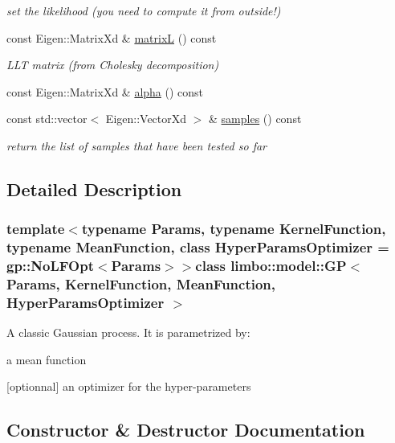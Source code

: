 \begin{DoxyCompactItemize}
\begin{DoxyCompactList}\small\item\em set the likelihood (you need to compute it from outside!) \end{DoxyCompactList}\item 
const Eigen\+::\+Matrix\+Xd \& \hyperlink{classlimbo_1_1model_1_1_g_p_a6f3a88531cc874a3a0cae0c218b0cf0a}{matrix\+L} () const 
\begin{DoxyCompactList}\small\item\em L\+L\+T matrix (from Cholesky decomposition) \end{DoxyCompactList}\item 
const Eigen\+::\+Matrix\+Xd \& \hyperlink{classlimbo_1_1model_1_1_g_p_adab606218ab9ef0c35babf8d1cc16d81}{alpha} () const 
\item 
const std\+::vector$<$ Eigen\+::\+Vector\+Xd $>$ \& \hyperlink{classlimbo_1_1model_1_1_g_p_abaa15a2e503bac670dd1a35fb377aa23}{samples} () const 
\begin{DoxyCompactList}\small\item\em return the list of samples that have been tested so far \end{DoxyCompactList}\end{DoxyCompactItemize}


\subsection{Detailed Description}
\subsubsection*{template$<$typename Params, typename Kernel\+Function, typename Mean\+Function, class Hyper\+Params\+Optimizer = gp\+::\+No\+L\+F\+Opt$<$\+Params$>$$>$class limbo\+::model\+::\+G\+P$<$ Params, Kernel\+Function, Mean\+Function, Hyper\+Params\+Optimizer $>$}

A classic Gaussian process. It is parametrized by\+:
\begin{DoxyItemize}
\item a mean function
\item \mbox{[}optionnal\mbox{]} an optimizer for the hyper-\/parameters 
\end{DoxyItemize}

\subsection{Constructor \& Destructor Documentation}
\hypertarget{classlimbo_1_1model_1_1_g_p_aa18de82f231f3aed6ce8cce4c778aedb}{}
